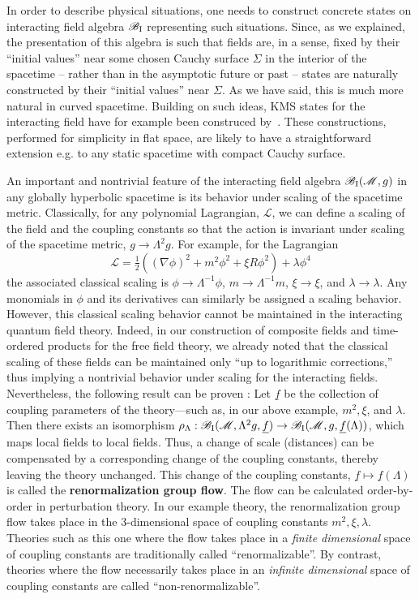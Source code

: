 \documentclass[12pt]{article}
\newcommand{\half}{\tfrac12}
\newcommand{\rI}{{\rm I}}
\newcommand{\eB}{\mathscr{B}}
\newcommand{\eL}{\mathscr{L}}
\renewcommand{\half}{\tfrac{1}{2}}
\newcommand{\M}{\mathscr{M}}
\theoremstyle{plain}
\theoremstyle{definition}
\def\ben{\begin{equation}}
\def\een{\end{equation}}
\begin{document}
In order to describe physical situations, one needs to construct concrete states on interacting field algebra $\eB_\rI$ representing such situations. Since, as we explained, 
the presentation of this algebra is such that fields are, in a sense, fixed by their ``initial values'' near some chosen Cauchy surface $\Sigma$ in the interior of the spacetime -- rather 
than in the asymptotic future or past -- states are naturally constructed by their ``initial values'' near $\Sigma$. As we have said, this is much more natural in curved spacetime. Building on such ideas, KMS states for the interacting field have for example been construced by~\cite{fred2}.  These constructions, performed for simplicity in flat space, are likely to have a straightforward 
extension e.g. to any static spacetime with compact Cauchy surface. 


\vspace{.5cm}

An important and nontrivial feature of the interacting field algebra $\eB_{\rI}(\M,g)$ in any globally hyperbolic spacetime is its behavior under scaling of the spacetime metric. Classically, for any polynomial Lagrangian, $\eL$, we can define a scaling of the field and the coupling constants so that the action is invariant under scaling of the spacetime metric, $g \to \Lambda^2 g$. For example, for the Lagrangian
\ben
\eL = \half ( (\nabla \phi)^2 + m^2 \phi^2 + \xi R \phi^2) + \lambda \phi^4
\een
the associated classical scaling is $\phi \to \Lambda^{-1} \phi$, $m \to \Lambda^{-1} m$, $\xi \to \xi$, and 
$\lambda \to \lambda$. Any monomials in $\phi$ and its derivatives can similarly be assigned a scaling behavior. However, this classical scaling behavior cannot be maintained in the interacting quantum
field theory. Indeed, in our construction of composite fields and time-ordered products for the free field theory, we already noted that the classical scaling of these fields can be maintained only ``up to logarithmic corrections,'' thus implying a nontrivial behavior under scaling for the interacting fields.
Nevertheless, the following result can be proven \cite{hw3}: Let $\underline f$ be the collection of 
coupling parameters of the theory---such as, in our above example, $m^2, \xi$, and $\lambda$. Then there exists an 
isomorphism $\rho_\Lambda: \eB_{\rI}(\M, \Lambda^2 g, \underline{f}) \to \eB_{\rI}(\M, g, \underline{f}(\Lambda))$, 
which maps local fields to local fields. Thus, a change of scale (distances) can be compensated by a
corresponding change of the coupling constants, thereby 
leaving the theory unchanged. This change of the coupling constants, $\underline{f} \mapsto \underline{f}(\Lambda)$ is called the {\bf renormalization group flow}. The flow can be calculated order-by-order in perturbation theory. In our example theory, the renormalization group flow takes place in the 3-dimensional space of coupling constants $m^2, \xi, \lambda$. 
Theories such as this one where the flow takes place in a {\em finite dimensional} space of coupling constants are traditionally called ``renormalizable''. By contrast, theories where 
the flow necessarily takes place in an {\em infinite dimensional} space of coupling constants are called ``non-renormalizable''. 
\end{document}
